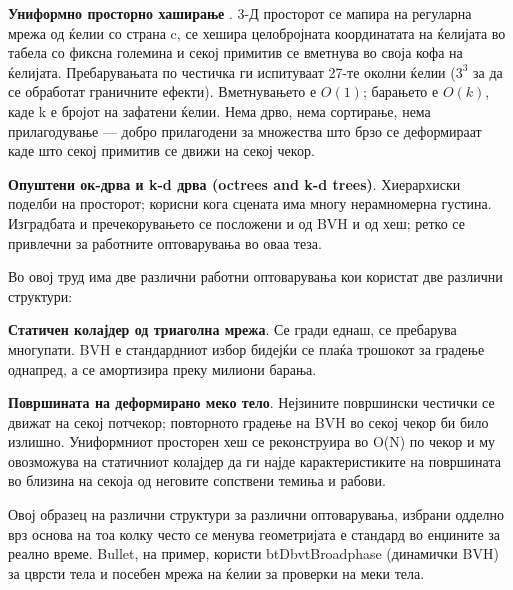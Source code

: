 \textbf{Униформно просторно хаширање }\cite{teschner2003optimized}. 3-Д просторот се мапира на регуларна мрежа од ќелии со страна c, се хешира целобројната координатата на ќелијата во табела со фиксна големина и секој примитив се вметнува во своја кофа на ќелијата. Пребарувањата по честичка ги испитуваат 27-те околни ќелии ($3^3$ за да се обработат граничните ефекти). Вметнувањето е $O(1)$; барањето е $O(k)$, каде k е бројот на зафатени ќелии. Нема дрво, нема сортирање, нема прилагодување — добро прилагодени за множества што брзо се деформираат каде што секој примитив се движи на секој чекор.

\textbf{Опуштени ок-дрва и k-d дрва (octrees and k-d trees)}. Хиерархиски поделби на просторот; корисни кога сцената има многу нерамномерна густина. Изградбата и пречекорувањето се посложени и од BVH и од хеш; ретко се привлечни за работните оптоварувања во оваа теза.


Во овој труд има две различни работни оптоварувања кои користат две различни структури:

\textbf{Статичен колајдер од триаголна мрежа}. Се гради еднаш, се пребарува многупати. BVH е стандардниот избор бидејќи се плаќа трошокот за градење однапред, а се амортизира преку милиони барања.

\textbf{Површината на деформирано меко тело}. Нејзините површински честички се движат на секој потчекор; повторното градење на BVH во секој чекор би било излишно. Униформниот просторен хеш се реконструира во O(N) по чекор и му овозможува на статичниот колајдер да ги најде карактеристиките на површината во близина на секоја од неговите сопствени темиња и рабови.

Овој образец на различни структури за различни оптоварувања, избрани одделно врз основа на тоа колку често се менува геометријата е стандард во енџините за реално време. Bullet, на пример, користи btDbvtBroadphase (динамички BVH) за цврсти тела и посебен мрежа на ќелии за проверки на меки тела.


